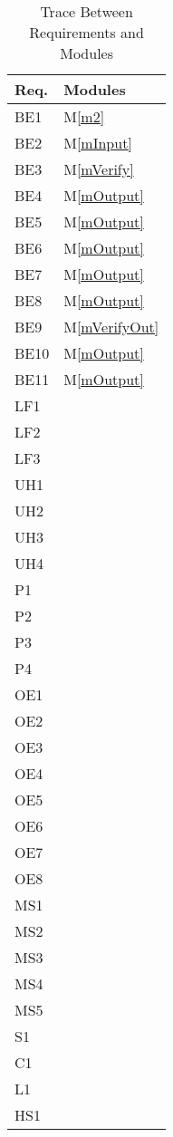 \documentclass[12pt, titlepage]{article}
\newcommand{\mref}[1]{M\ref{#1}}
\begin{document}
\begin{table}[H]
    \centering
    \begin{tabular}{p{} p{}}
        \toprule
        \textbf{Req.} & \textbf{Modules}\\
        \midrule
        BE1 & \mref{m2}\\
        BE2 & \mref{mInput}\\
        BE3 & \mref{mVerify}\\
        BE4 & \mref{mOutput}\\
        BE5 & \mref{mOutput}\\
        BE6 & \mref{mOutput}\\
        BE7 & \mref{mOutput}\\
        BE8 & \mref{mOutput}\\
        BE9 & \mref{mVerifyOut}\\
        BE10 & \mref{mOutput}\\
        BE11 & \mref{mOutput}\\
        LF1 & ~\\
        LF2 & ~\\
        LF3 & ~\\
        UH1 & ~\\
        UH2 & ~\\
        UH3 & ~\\
        UH4 & ~\\
        P1 & ~\\
        P2 & ~\\
        P3 & ~\\
        P4 & ~\\
        OE1 & ~\\
        OE2 & ~\\
        OE3 & ~\\
        OE4 & ~\\
        OE5 & ~\\
        OE6 & ~\\
        OE7 & ~\\
        OE8 & ~\\
        MS1 & ~\\
        MS2 & ~\\
        MS3 & ~\\
        MS4 & ~\\
        MS5 & ~\\
        S1 & ~\\
        C1 & ~\\
        L1 & ~\\
        HS1 & ~\\
        \bottomrule
    \end{tabular}
    \caption{Trace Between Requirements and Modules}
    \label{TblRT}
\end{table}
\end{document}
